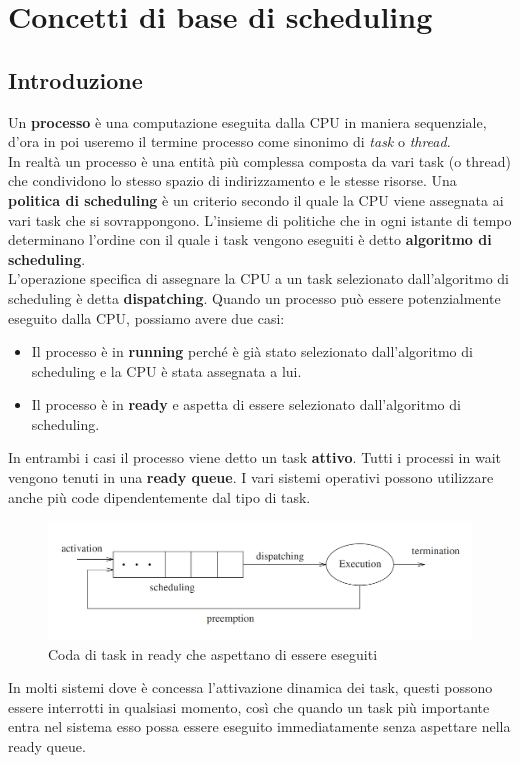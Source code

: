 \documentclass[12pt,openany,onesided]{book}
\begin{document}
\chapter{Concetti di base di scheduling}
\section{Introduzione}
Un \textbf{processo} è una computazione eseguita dalla CPU in maniera sequenziale, d'ora in poi useremo il termine processo come sinonimo di \textit{task} o \textit{thread}.
\\
In realtà un processo è una entità più complessa composta da vari task (o thread)
che condividono lo stesso spazio di indirizzamento e le stesse risorse.
Una \textbf{politica di scheduling} è un criterio secondo il quale la CPU viene assegnata ai vari task che si sovrappongono.
L'insieme di politiche che in ogni istante di tempo determinano l'ordine con il quale i task vengono eseguiti è detto \textbf{algoritmo di scheduling}.\\
L'operazione specifica di assegnare la CPU a un task selezionato dall'algoritmo di scheduling è detta \textbf{dispatching}.
Quando un processo può essere potenzialmente eseguito dalla CPU, possiamo avere due casi: 
\begin{itemize}
    \item Il processo è in \textbf{running} perché è già stato selezionato dall'algoritmo di scheduling e la CPU è stata assegnata a lui.
    \item Il processo è in \textbf{ready} e aspetta di essere selezionato dall'algoritmo di scheduling.
\end{itemize}
In entrambi i casi il processo viene detto un task \textbf{attivo}. Tutti i processi in wait vengono tenuti in una \textbf{ready queue}. I vari sistemi operativi possono utilizzare anche più code dipendentemente dal tipo di task.
\begin{figure}
\centering
\includegraphics[width=\textwidth]{pictures/cicloEsecuzione.png}
\caption{Coda di task in ready che aspettano di essere eseguiti}
\end{figure}
In molti sistemi dove è concessa l'attivazione dinamica dei task, questi possono essere interrotti in qualsiasi momento, così che quando un task più importante entra nel sistema esso possa essere eseguito immediatamente senza aspettare nella ready queue.
\end{document}
